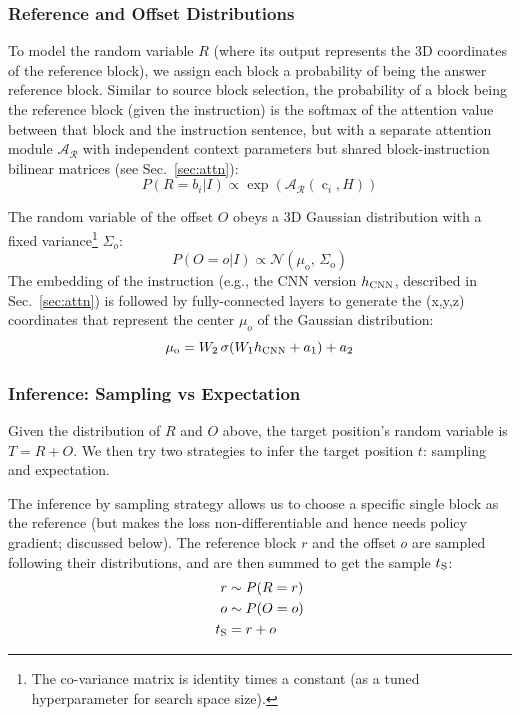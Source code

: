 \documentclass[letterpaper]{article} %
\DeclareMathOperator{\embb}{c}
\begin{document}
\subsubsection{Reference and Offset Distributions}
To model the random variable $R$ (where its output represents the 3D coordinates of the reference block), we assign each block a probability of being the answer reference block. 
Similar to source block selection, the probability of a block being the reference block (given the instruction) is the softmax of the attention value between that block and the instruction sentence, but with a separate attention module $\mathcal{A_R}$ with independent context parameters but shared block-instruction bilinear matrices (see Sec.~\ref{sec:attn}):
\begin{equation}
P(R=b_i | I) \propto \exp(\mathcal{A_R}(\embb_i, H))
\end{equation}

The random variable of the offset $O$ obeys a 3D Gaussian distribution with a fixed variance\footnote{The co-variance matrix is identity times a constant (as a tuned hyperparameter for search space size).} $\Sigma_o$:
\begin{equation}
P(O = o | I) \propto \mathcal{N}(\mu_\text{o},\, \Sigma_\text{o})
\end{equation}
The embedding of the instruction (e.g., the CNN version $h_{\textsc{CNN}}$, described in Sec.~\ref{sec:attn}) is followed by fully-connected layers to generate the (x,y,z) coordinates that represent the center $\mu_o$ of the Gaussian distribution:
\begin{equation}
\mu_\text{o} = W_2 \, \sigma(W_1 h_{\textsc{CNN}} + a_1) + a_2 
\end{equation}

\subsubsection{Inference: Sampling vs Expectation}
\label{sec:inference}
Given the distribution of $R$ and $O$ above, the target position's random variable is $T = R  + O$. We then try two strategies to infer the target position $t$: sampling and expectation. 

The inference by sampling strategy allows us to choose a specific single block as the reference (but makes the loss non-differentiable and hence needs policy gradient; discussed below). The reference block $r$ and the offset $o$ are sampled following their distributions, and are then summed to get the sample $t_\textsc{S}$:
\begin{align}
r & \sim P(R = r) \\
o & \sim P(O = o) \\
t_\textsc{S} & = r + o
\end{align}
\end{document}
